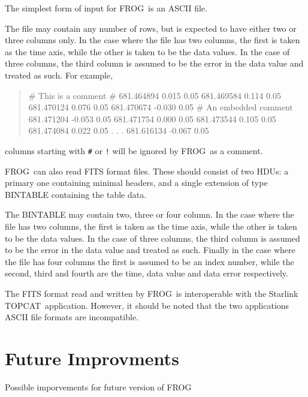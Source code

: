 \documentclass[twoside,11pt,nolof]{starlink}
\providecommand{\FROG}{\textsf{FROG}}
\providecommand{\TOPCAT}{\textsf{TOPCAT}}
\begin{document}
The simplest form of input for \FROG\ is an ASCII file. 

The file may contain any number of rows, but is expected to have either two or three columns only. In the case where the file has two columns, the first is taken as the time axis, while the other is taken to be the data values. In the case of three columns, the third column is assumed to be the error in the data value and treated as such. For example,
\begin{quote}
\begin{terminalv}
# This is a comment
#
681.464894  0.015 0.05
681.469584  0.114 0.05
681.470124  0.076 0.05
681.470674 -0.030 0.05
# An embedded comment
681.471204 -0.053 0.05
681.471754  0.000 0.05
681.473544  0.105 0.05
681.474084  0.022 0.05
          .
          .
          .
681.616134 -0.067 0.05      
\end{terminalv}
\end{quote}
columns starting with \verb+#+ or \verb+!+ will be ignored by \FROG\ as a comment.

\FROG\ can also read FITS format files. These should consist of two HDUs: a primary one containing minimal headers, and a single extension of type BINTABLE containing the table data.

The BINTABLE may contain two, three or four column. In the case where the file has two columns, the first is taken as the time axis, while the other is taken to be the data values. In the case of three columns, the third column is assumed to be the error in the data value and treated as such. Finally in the case where the file has four columns the first is assumed to be an index number, while the second, third and fourth are the time, data value and data error respectively.

The FITS format read and written by \FROG\ is interoperable with the Starlink \TOPCAT\ application. However, it should be noted that the two applications ASCII file formats are incompatible.

\section{Future Improvments}

Possible imporvements for future version of \FROG\
\end{document}

